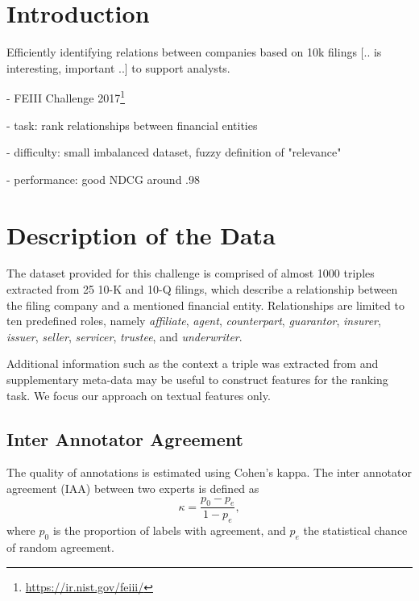 \section{Introduction}
Efficiently identifying relations between companies based on 10k filings [.. is interesting, important ..] to support analysts.

- FEIII Challenge 2017\footnote{\url{https://ir.nist.gov/feiii/}}

- task: rank relationships between financial entities

- difficulty: small imbalanced dataset, fuzzy definition of "relevance"

- performance: good NDCG around .98


\section{Description of the Data}
The dataset provided for this challenge is comprised of almost 1000 triples extracted from 25 10-K and 10-Q filings, which describe a relationship between the filing company and a mentioned financial entity. Relationships are limited to ten predefined roles, namely \textit{affiliate}, \textit{agent}, \textit{counterpart}, \textit{guarantor}, \textit{insurer}, \textit{issuer}, \textit{seller}, \textit{servicer}, \textit{trustee}, and \textit{underwriter}.

Additional information such as the context a triple was extracted from and supplementary meta-data may be useful to construct features for the ranking task. We focus our approach on textual features only. 

\subsection{Inter Annotator Agreement}
The quality of annotations is estimated using Cohen's kappa. The inter annotator agreement (IAA) between two experts is defined as
$$
\kappa = \frac{p_0-p_e}{1-p_e},
$$
where $p_0$ is the proportion of labels with agreement, and $p_e$ the statistical chance of random agreement.


